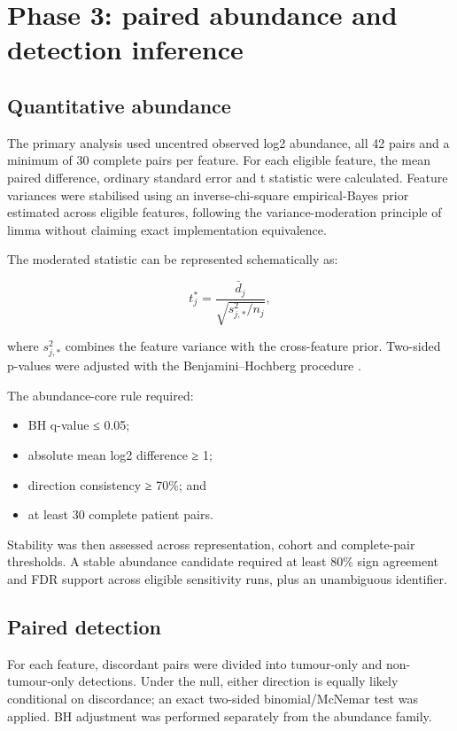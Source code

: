 \section{Phase 3: paired abundance and detection inference}
\label{sec:phase_3_paired_abundance_and_detection_inference}

\subsection{Quantitative abundance}

The primary analysis used uncentred observed log2 abundance, all 42 pairs and a minimum of 30 complete pairs per feature. For each eligible feature, the mean paired difference, ordinary standard error and t statistic were calculated. Feature variances were stabilised using an inverse-chi-square empirical-Bayes prior estimated across eligible features, following the variance-moderation principle of limma \parencite{smyth2004,ritchie2015} without claiming exact implementation equivalence.

The moderated statistic can be represented schematically as:

\[
t_j^*=\frac{\bar d_j}{\sqrt{s_{j,*}^2/n_j}},
\]

where \(s_{j,*}^{2}\) combines the feature variance with the cross-feature prior. Two-sided p-values were adjusted with the Benjamini–Hochberg procedure \parencite{benjamini1995}.

The abundance-core rule required:

\begin{itemize}
\item BH q-value ≤ 0.05;
\item absolute mean log2 difference ≥ 1;
\item direction consistency ≥ 70\%; and
\item at least 30 complete patient pairs.
\end{itemize}

Stability was then assessed across representation, cohort and complete-pair thresholds. A stable abundance candidate required at least 80\% sign agreement and FDR support across eligible sensitivity runs, plus an unambiguous identifier.

\subsection{Paired detection}

For each feature, discordant pairs were divided into tumour-only and non-tumour-only detections. Under the null, either direction is equally likely conditional on discordance; an exact two-sided binomial/McNemar test was applied. BH adjustment was performed separately from the abundance family.

